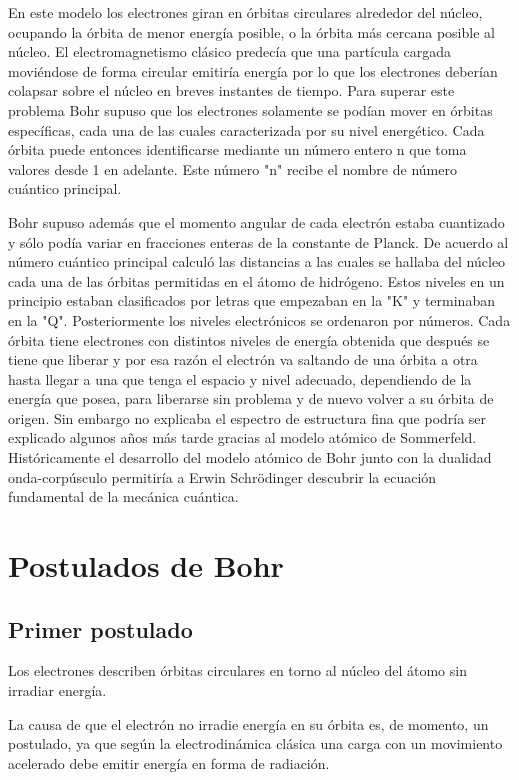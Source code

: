 \documentclass[12pt,a4paper]{article}
\begin{document}
En este modelo los electrones giran en órbitas circulares alrededor del núcleo, ocupando la órbita de menor energía posible, o la órbita más cercana posible al núcleo. El electromagnetismo clásico predecía que una partícula cargada moviéndose de forma circular emitiría energía por lo que los electrones deberían colapsar sobre el núcleo en breves instantes de tiempo. Para superar este problema Bohr supuso que los electrones solamente se podían mover en órbitas específicas, cada una de las cuales caracterizada por su nivel energético. Cada órbita puede entonces identificarse mediante un número entero n que toma valores desde 1 en adelante. Este número "n" recibe el nombre de número cuántico principal.

Bohr supuso además que el momento angular de cada electrón estaba cuantizado y sólo podía variar en fracciones enteras de la constante de Planck. De acuerdo al número cuántico principal calculó las distancias a las cuales se hallaba del núcleo cada una de las órbitas permitidas en el átomo de hidrógeno. Estos niveles en un principio estaban clasificados por letras que empezaban en la "K" y terminaban en la "Q". Posteriormente los niveles electrónicos se ordenaron por números. Cada órbita tiene electrones con distintos niveles de energía obtenida que después se tiene que liberar y por esa razón el electrón va saltando de una órbita a otra hasta llegar a una que tenga el espacio y nivel adecuado, dependiendo de la energía que posea, para liberarse sin problema y de nuevo volver a su órbita de origen. Sin embargo no explicaba el espectro de estructura fina que podría ser explicado algunos años más tarde gracias al modelo atómico de Sommerfeld. Históricamente el desarrollo del modelo atómico de Bohr junto con la dualidad onda-corpúsculo permitiría a Erwin Schrödinger descubrir la ecuación fundamental de la mecánica cuántica.

\section{Postulados de Bohr}

\subsection*{Primer postulado}
Los electrones describen órbitas circulares en torno al núcleo del átomo sin irradiar energía.

La causa de que el electrón no irradie energía en su órbita es, de momento, un postulado, ya que según la electrodinámica clásica una carga con un movimiento acelerado debe emitir energía en forma de radiación.
\end{document}
